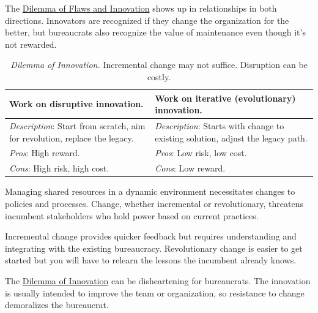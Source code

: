 The \hyperref[table:flaws-and-innovation]{Dilemma of Flaws and Innovation} shows up in relationships in both directions. Innovators are recognized if they change the organization for the better, but bureaucrats also recognize the value of maintenance even though it's not rewarded. 


\begin{center}
\begin{table}[H] %
\begin{tabular}{ | m{\dilemmatablewidth}| m{\dilemmatablewidth} | } 
  \hline
  \textbf{Work on disruptive innovation.} &
  \textbf{Work on iterative (evolutionary) innovation.} \\
  \hline
  \textit{Description}: Start from scratch, aim for revolution, replace the legacy.  &
  \textit{Description}: Starts with change to existing solution, adjust the legacy path.  \\  
  \hline
  \textit{Pros}: High reward. & 
  \textit{Pros}: Low risk, low cost. \\
  \hline
  \textit{Cons}: High risk, high cost. & 
  \textit{Cons}: Low reward. \\
  \hline
\end{tabular}
\caption{\textit{Dilemma of Innovation.}
Incremental change may not suffice. Disruption can be costly.
}
\label{table:disruptive-or-iterative}
\end{table}
\end{center}

Managing shared resources in a dynamic environment necessitates changes to policies and processes. Change, whether incremental or revolutionary, threatens incumbent stakeholders who hold power based on current practices. 

Incremental change provides quicker feedback but requires understanding and integrating with the existing bureaucracy. Revolutionary change is easier to get started but you will have to relearn the lessons the incumbent already knows.

The \hyperref[table:disruptive-or-iterative]{Dilemma of Innovation} can be disheartening for bureaucrats. The innovation is usually intended to improve the team or organization, so resistance to change demoralizes the bureaucrat. 

